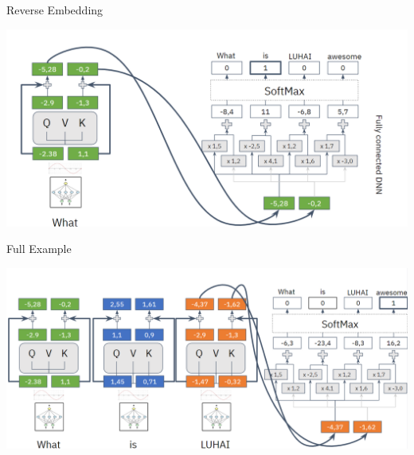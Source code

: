 \documentclass[aspectratio=169]{../latex_main/tntbeamer}  %
\begin{document}
        \begin{frame}{Reverse Embedding}

            \centering
            \includegraphics[width=0.9\linewidth]{figure/transformer12.png}
        
        \end{frame}

        \begin{frame}{Full Example}

            \centering
            \includegraphics[width=0.9\linewidth]{figure/transformer13.png}
        
        \end{frame}
\end{document}
